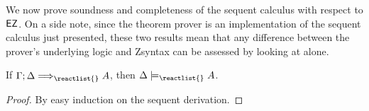 We now prove soundness and completeness of the sequent calculus with respect to
$\textsf{EZ}{}$. On a side note, since the theorem prover is an implementation of the
sequent calculus just presented, these two results mean that any difference
between the prover's underlying logic and Zsyntax can be assessed by looking at
\eznd{} alone.

\begin{theorem}[Soundness]
  If $\zsyseq{\Gamma}{\Delta}{\reactlist{}}{A}$, then
  $\Delta \models_{\reactlist{}} A$.
\end{theorem}
\begin{proof}
  By easy induction on the sequent derivation.

\end{proof}
